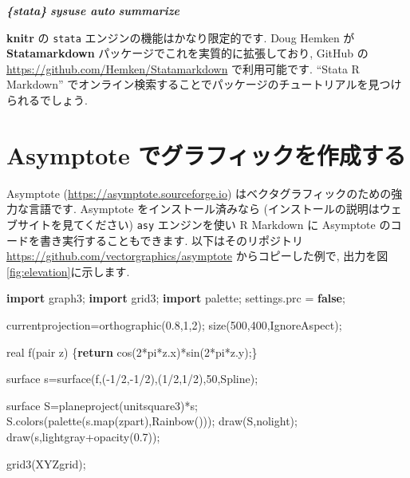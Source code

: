 \documentclass[
  11pt,
  lualatex,ja=standard,jafont=noto]{bxjsreport}
\newenvironment{Shaded}{\begin{snugshade}}{\end{snugshade}}
\newcommand{\ControlFlowTok}[1]{\textcolor[rgb]{0.13,0.29,0.53}{\textbf{#1}}}
\newcommand{\DecValTok}[1]{\textcolor[rgb]{0.00,0.00,0.81}{#1}}
\newcommand{\FloatTok}[1]{\textcolor[rgb]{0.00,0.00,0.81}{#1}}
\newcommand{\InformationTok}[1]{\textcolor[rgb]{0.56,0.35,0.01}{\textbf{\textit{#1}}}}
\newcommand{\KeywordTok}[1]{\textcolor[rgb]{0.13,0.29,0.53}{\textbf{#1}}}
\newcommand{\NormalTok}[1]{#1}
\begin{document}
\begin{Shaded}
\begin{Highlighting}[]
\InformationTok{\textasciigrave{}\textasciigrave{}\textasciigrave{}\{stata\}}
\InformationTok{sysuse auto}
\InformationTok{summarize}
\InformationTok{\textasciigrave{}\textasciigrave{}\textasciigrave{}}
\end{Highlighting}
\end{Shaded}

\textbf{knitr} の \texttt{stata} エンジンの機能はかなり限定的です. Doug Hemken が \textbf{Statamarkdown} パッケージでこれを実質的に拡張しており, GitHub の \url{https://github.com/Hemken/Statamarkdown} で利用可能です. ``Stata R Markdown'' でオンライン検索することでパッケージのチュートリアルを見つけられるでしょう.

\hypertarget{eng-asy}{%
\section{Asymptote でグラフィックを作成する}\label{eng-asy}}

Asymptote (\url{https://asymptote.sourceforge.io}) はベクタグラフィックのための強力な言語です. Asymptote をインストール済みなら (インストールの説明はウェブサイトを見てください) \texttt{asy} エンジンを使い R Markdown に Asymptote のコードを書き実行することもできます. 以下はそのリポジトリ \url{https://github.com/vectorgraphics/asymptote} からコピーした例で, 出力を図\ref{fig:elevation}に示します.

\begin{Shaded}
\begin{Highlighting}[numbers=left,,]
\KeywordTok{import}\NormalTok{ graph3;}
\KeywordTok{import}\NormalTok{ grid3;}
\KeywordTok{import}\NormalTok{ palette;}
\NormalTok{settings.prc = }\KeywordTok{false}\NormalTok{;}

\NormalTok{currentprojection=orthographic(}\FloatTok{0.8}\NormalTok{,}\DecValTok{1}\NormalTok{,}\DecValTok{2}\NormalTok{);}
\NormalTok{size(}\DecValTok{500}\NormalTok{,}\DecValTok{400}\NormalTok{,IgnoreAspect);}

\NormalTok{real f(pair z) \{}\ControlFlowTok{return}\NormalTok{ cos(}\DecValTok{2}\NormalTok{*pi*z.x)*sin(}\DecValTok{2}\NormalTok{*pi*z.y);\}}

\NormalTok{surface s=surface(f,({-}}\DecValTok{1}\NormalTok{/}\DecValTok{2}\NormalTok{,{-}}\DecValTok{1}\NormalTok{/}\DecValTok{2}\NormalTok{),(}\DecValTok{1}\NormalTok{/}\DecValTok{2}\NormalTok{,}\DecValTok{1}\NormalTok{/}\DecValTok{2}\NormalTok{),}\DecValTok{50}\NormalTok{,Spline);}

\NormalTok{surface S=planeproject(unitsquare3)*s;}
\NormalTok{S.colors(palette(s.map(zpart),Rainbow()));}
\NormalTok{draw(S,nolight);}
\NormalTok{draw(s,lightgray+opacity(}\FloatTok{0.7}\NormalTok{));}

\NormalTok{grid3(XYZgrid);}
\end{Highlighting}
\end{Shaded}
\end{document}
